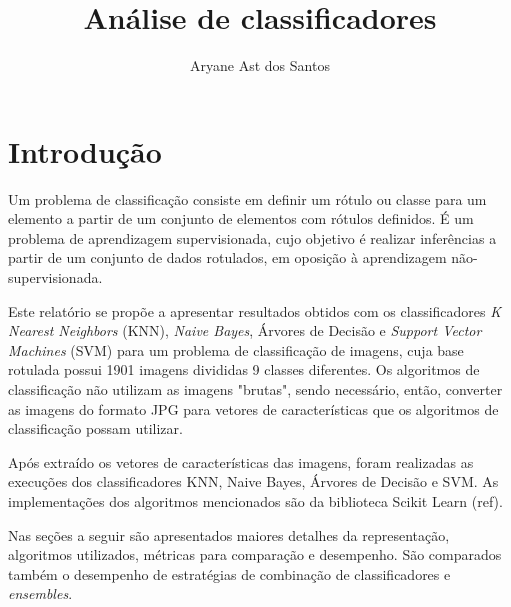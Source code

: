 \documentclass[conference]{IEEEtran}
\begin{document}
\title{Análise de classificadores}
\author{Aryane Ast dos Santos}



\author
{
}

\maketitle






%


\section{Introdução}

Um problema de classificação consiste em definir um rótulo ou classe para um
elemento a partir de um conjunto de elementos com rótulos definidos. É um
problema de aprendizagem supervisionada, cujo objetivo é realizar inferências a
partir de um conjunto de dados rotulados, em oposição à aprendizagem
não-supervisionada.

Este relatório se propõe a apresentar resultados obtidos com os
classificadores \emph{K Nearest Neighbors} (KNN), \emph{Naive Bayes}, Árvores de
Decisão e \emph{Support Vector Machines} (SVM) para um problema de classificação de
imagens, cuja base rotulada possui 1901 imagens divididas 9 classes diferentes.
Os algoritmos de classificação não utilizam as imagens "brutas", sendo necessário, então, converter as imagens do formato JPG para vetores de características
que os algoritmos de classificação possam utilizar.

Após extraído os vetores de características das imagens, foram realizadas
as execuções dos classificadores KNN, Naive Bayes, Árvores de Decisão e SVM. As
implementações dos algoritmos mencionados são da biblioteca Scikit Learn (ref).

Nas seções a seguir são apresentados maiores detalhes da representação,
algoritmos utilizados, métricas para comparação e desempenho.
São comparados também o desempenho de estratégias de combinação de
classificadores e \emph{ensembles}.
\end{document}
